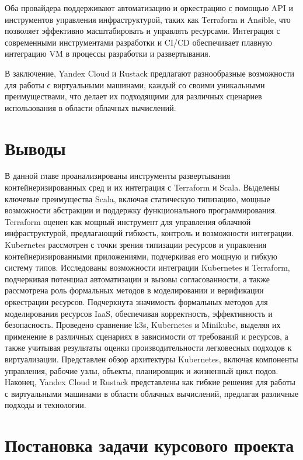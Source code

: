 Оба провайдера поддерживают автоматизацию и оркестрацию с помощью API и
инструментов управления инфраструктурой, таких как Terraform и Ansible, что
позволяет эффективно масштабировать и управлять ресурсами. Интеграция с
современными инструментами разработки и CI/CD обеспечивает плавную интеграцию VM
в процессы разработки и развертывания.

В заключение, Yandex Cloud и Rustack предлагают разнообразные возможности для
работы с виртуальными машинами, каждый со своими уникальными преимуществами, что
делает их подходящими для различных сценариев использования в области облачных
вычислений.

\section{Выводы}

В данной главе проанализированы инструменты развертывания контейнеризированных
сред и их интеграция с Terraform и Scala. Выделены ключевые преимущества Scala,
включая статическую типизацию, мощные возможности абстракции и поддержку
функционального
программирования. Terraform оценен как мощный инструмент для управления облачной
инфраструктурой, предлагающий гибкость, контроль и возможности интеграции. 
Kubernetes рассмотрен с точки зрения типизации ресурсов и управления
контейнеризированными приложениями, подчеркивая его мощную и гибкую систему
типов.
Исследованы возможности интеграции Kubernetes и Terraform, подчеркивая потенциал
автоматизации и вызовы согласованности, а также рассмотрена роль формальных
методов
в моделировании и верификации оркестрации ресурсов. Подчеркнута значимость
формальных методов
для моделирования ресурсов IaaS, обеспечивая корректность, эффективность и
безопасность.
Проведено сравнение k3s, Kubernetes и Minikube, выделяя их применение в
различных
сценариях в зависимости от требований и ресурсов, а также учитывая результаты
оценки
производительности легковесных подходов к виртуализации. Представлен обзор
архитектуры
Kubernetes, включая компоненты управления, рабочие узлы, объекты, планировщик и 
жизненный цикл подов. Наконец, Yandex Cloud и Rustack представлены как гибкие
решения для работы с виртуальными машинами в области облачных вычислений, 
предлагая различные подходы и технологии.

\section{Постановка задачи курсового проекта}

